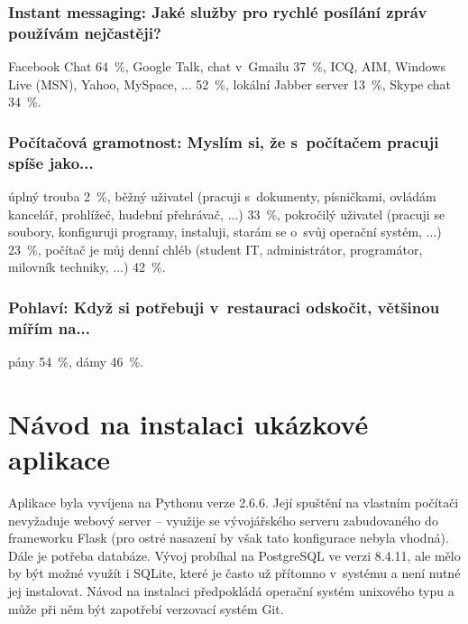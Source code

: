 \documentclass[12pt,oneside,final]{fithesis2}
\begin{document}
\subsection*{Instant messaging: Jaké služby pro rychlé posílání zpráv používám nejčastěji?}
Facebook Chat 64~\%,
Google Talk, chat v~Gmailu 37~\%,
ICQ, AIM, Windows Live (MSN), Yahoo, MySpace, ... 52~\%,
lokální Jabber server 13~\%,
Skype chat 34~\%.

\subsection*{Počítačová gramotnost: Myslím si, že s~počítačem pracuji spíše jako...}
úplný trouba 2~\%,
běžný uživatel (pracuji s~dokumenty, písničkami, ovládám kancelář, prohlížeč, hudební přehrávač, ...) 33~\%,
pokročilý uživatel (pracuji se soubory, konfiguruji programy, instaluji, starám se o~svůj operační systém, ...) 23~\%,
počítač je můj denní chléb (student IT, administrátor, programátor, milovník techniky, ...) 42~\%.

\subsection*{Pohlaví: Když si potřebuji v~restauraci odskočit, většinou mířím na...}
pány 54~\%,
dámy 46~\%.



\chapter{Návod na instalaci ukázkové aplikace}\label{tutorial}
Aplikace byla vyvíjena na Pythonu verze 2.6.6. Její spuštění na vlastním počítači nevyžaduje webový server -- využije se vývojářského serveru zabudovaného do frameworku Flask (pro ostré nasazení by však tato konfigurace nebyla vhodná). Dále je potřeba databáze. Vývoj probíhal na PostgreSQL ve verzi 8.4.11, ale mělo by být možné využít i SQLite, které je často už přítomno v~systému a není nutné jej instalovat. Návod na instalaci předpokládá operační systém unixového typu a může při něm být zapotřebí verzovací systém Git.
\end{document}
